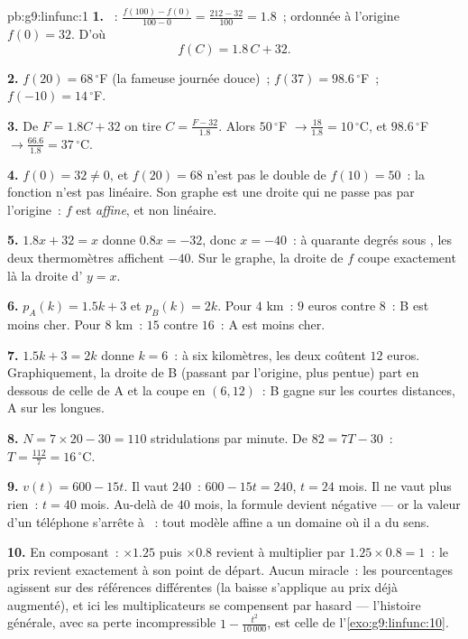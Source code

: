 \begin{solution}{pb:g9:linfunc:1}
\textbf{1.} ~:
$\frac{f(100) - f(0)}{100 - 0} = \frac{212 - 32}{100} = 1.8$~;
ordonnée à l'origine $f(0) = 32$. D'où
\[
f(C) = 1.8\,C + 32 .
\]

\textbf{2.} $f(20) = 68\,^\circ$F (la fameuse journée douce)~;
$f(37) = 98.6\,^\circ$F~; $f(-10) = 14\,^\circ$F.

\textbf{3.} De $F = 1.8C + 32$ on tire $C = \frac{F - 32}{1.8}$.
Alors $50\,^\circ$F $\to \frac{18}{1.8} = 10\,^\circ$C, et
$98.6\,^\circ$F $\to \frac{66.6}{1.8} = 37\,^\circ$C.

\textbf{4.} $f(0) = 32 \neq 0$, et $f(20) = 68$ n'est pas le double
de $f(10) = 50$~: la fonction n'est pas linéaire. Son graphe est une
droite qui ne passe pas par l'origine~: $f$ est \emph{affine}, et
non linéaire.

\textbf{5.} $1.8x + 32 = x$ donne $0.8x = -32$, donc $x = -40$~: à
quarante degrés sous , les deux thermomètres affichent $-40$.
Sur le graphe, la droite de $f$ coupe exactement là la droite
d' $y = x$.

\textbf{6.} $p_A(k) = 1.5k + 3$ et $p_B(k) = 2k$. Pour $4$ km~:
$9$ euros contre $8$~: B est moins cher. Pour $8$ km~: $15$ contre
$16$~: A est moins cher.

\textbf{7.} $1.5k + 3 = 2k$ donne $k = 6$~: à six kilomètres, les
deux coûtent $12$ euros. Graphiquement, la droite de B (passant par
l'origine, plus pentue) part en dessous de celle de A et la coupe en
$(6, 12)$~: B gagne sur les courtes distances, A sur les longues.

\textbf{8.} $N = 7 \times 20 - 30 = 110$ stridulations par minute.
De $82 = 7T - 30$~: $T = \frac{112}{7} = 16\,^\circ$C.

\textbf{9.} $v(t) = 600 - 15t$. Il vaut $240$~:
$600 - 15t = 240$, $t = 24$ mois. Il ne vaut plus rien~: $t = 40$
mois. Au-delà de $40$ mois, la formule devient négative --- or la
valeur d'un téléphone s'arrête à ~: tout modèle affine a un
domaine où il a du sens.

\textbf{10.} En composant~: $\times 1.25$ puis $\times 0.8$ revient
à multiplier par $1.25 \times 0.8 = 1$~: le prix revient exactement
à son point de départ. Aucun miracle~: les pourcentages agissent sur
des références différentes (la baisse s'applique au prix déjà
augmenté), et ici les multiplicateurs se compensent par hasard ---
l'histoire générale, avec sa perte incompressible
$1 - \frac{t^2}{10\,000}$, est celle de
l'\cref{exo:g9:linfunc:10}.


\end{solution}
